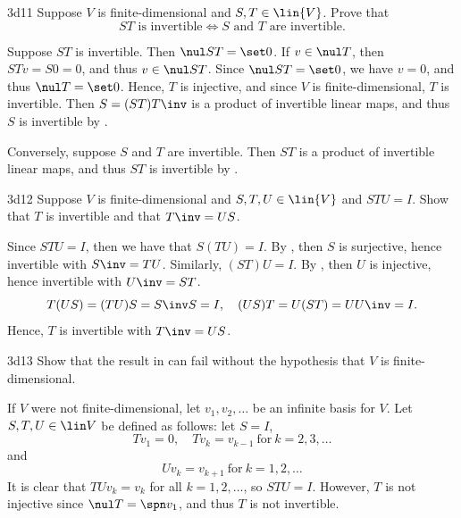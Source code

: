 \begin{exercise}{3d11}
    Suppose $V$ is finite-dimensional and $S, T \in \lin{V}$.
	Prove that
    \[
    	ST \text{ is invertible} \iff S \text{ and } T \text{ are invertible}.
    \]
\end{exercise}

\begin{sol}
    Suppose $ST$ is invertible.
	Then $\nul ST = \set 0$.
	If $v \in \nul T$, then $STv = S0 = 0$, and thus $v \in \nul ST$.
	Since $\nul ST = \set 0$, we have $v = 0$, and thus $\nul T = \set 0$.
	Hence, $T$ is injective, and since $V$ is finite-dimensional, $T$ is invertible.
	Then $S = (ST)T\inv$ is a product of invertible linear maps, and thus $S$ is invertible by .

    Conversely, suppose $S$ and $T$ are invertible.
    Then $ST$ is a product of invertible linear maps, and thus $ST$ is invertible by .
\end{sol}

\begin{exercise}{3d12}
    Suppose $V$ is finite-dimensional and $S, T, U \in \lin{V}$ and $STU = I$.
	Show that $T$ is invertible and that $T\inv = US$.
\end{exercise}

\begin{sol}
    Since $STU = I$, then we have that $S(TU) = I$.
	By , then $S$ is surjective, hence invertible with $S\inv = TU$.
	Similarly, $(ST)U = I$.
	By , then $U$ is injective, hence invertible with $U\inv = ST$.
    \[
    	T(US) = (TU)S = S\inv S = I, \quad (US)T = U(ST) = UU\inv = I.
    \]
    Hence, $T$ is invertible with $T\inv = US$.
\end{sol}

\begin{exercise}{3d13}
    Show that the result in  can fail without the hypothesis that $V$ is finite-dimensional.
\end{exercise}

\begin{sol}
    If $V$ were not finite-dimensional, let $v_1, v_2, \ldots$ be an infinite basis for $V$.
	Let $S, T, U \in \lin V$ be defined as follows: let $S = I$,
    \[
    	Tv_1 = 0, \quad Tv_k = v_{k - 1}~\text{for}~k = 2, 3, \ldots
    \]
    and
    \[
    	Uv_k = v_{k + 1}~\text{for}~k = 1, 2, \ldots
    \]
    It is clear that $TU v_k = v_k$ for all $k = 1, 2, \ldots$, so $STU = I$.
	However, $T$ is not injective since $\nul T = \spn v_1$, and thus $T$ is not invertible.
\end{sol}

